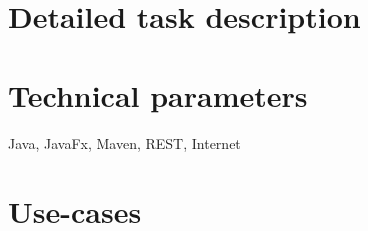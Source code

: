 \documentclass[a4paper]{article}
\begin{document}
	\section{Detailed task description}
	
	\section{Technical parameters}
	Java, JavaFx, Maven, REST, Internet
	
	\section{Use-cases}
	

	
\end{document}
